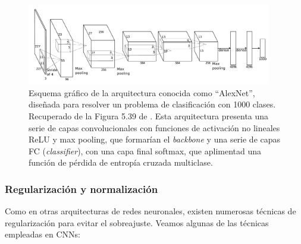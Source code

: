 \begin{figure}[h]
    \centering
    \includegraphics[width=0.95\textwidth]{capitulos/cap_02/imagenes/CNN_complete.png}
    \caption[
        Esquema gráfico de la arquitectura conocida como ``AlexNet'', diseñada para resolver un problema
        de clasificación con 1000 clases.
        Recuperado de la Figura 5.39 de \cite{szeliski2010}.
    ]{
        Esquema gráfico de la arquitectura conocida como ``AlexNet'', diseñada para resolver un problema
        de clasificación con 1000 clases.
        Recuperado de la Figura 5.39 de \cite{szeliski2010}.
        Esta arquitectura presenta una serie de capas convolucionales con funciones de activación no lineales 
        ReLU y max pooling, que formarían el \textit{backbone} y una serie de capas FC (\textit{classifier}), 
        con una capa final softmax, que aplimentad una función de pérdida de entropía cruzada multiclase.
    } 
    \label{fig:CNN_complete}
\end{figure}


\subsubsection{Regularización y normalización}

Como en otras arquitecturas de redes neuronales, existen numerosas técnicas de regularización para evitar
el sobreajuste. Veamos algunas de las técnicas empleadas en CNNs:


